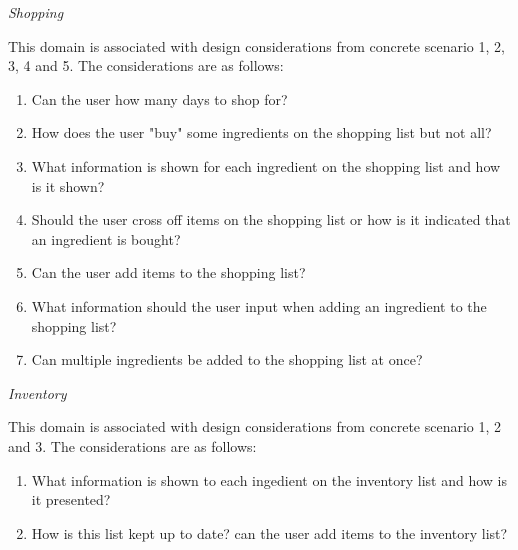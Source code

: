 \emph{Shopping}

This domain is associated with design considerations from concrete scenario 1, 2, 3, 4 and 5. The considerations are as follows:

\begin{enumerate}
	\item Can the user how many days to shop for?
	\item How does the user "buy" some ingredients on the shopping list but not all?
	\item What information is shown for each ingredient on the shopping list and how is it shown?
	\item Should the user cross off items on the shopping list or how is it indicated that an ingredient is bought?
	\item Can the user add items to the shopping list?
	\item What information should the user input when adding an ingredient to the shopping list?
	\item Can multiple ingredients be added to the shopping list at once?   
\end{enumerate}


\emph{Inventory}

This domain is associated with design considerations from concrete scenario 1, 2 and 3. The considerations are as follows:

\begin{enumerate}
	\item What information is shown to each ingedient on the inventory list and how is it presented? 
	\item How is this list kept up to date? can the user add items to the inventory list?
\end{enumerate}

